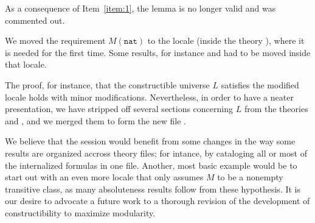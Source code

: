 As a consequence of Item~\ref{item:1}, the lemma
 is no longer valid and was commented
out.

We moved the requirement $M(\mathtt{nat})$ to the locale
 (inside the theory ), where it is needed for the first time. Some results,
for instance  and 
 had to be moved inside that
locale.

The proof, for instance, that the constructible universe $L$ satisfies
the modified locale  holds with minor
modifications. Nevertheless, in order to have a neater presentation,
we have stripped off several sections concerning $L$ from the theories
 and , and we merged them to form
the new file  . 

\medskip
{}
\medskip

We believe that the
 session  would benefit from some changes in
the way some results are organized accross theory files; for
intance, by cataloging all or most of the internalized formulas in one
file. Another, most basic example would be to start out with an even
more locale that only assumes $M$ to be a nonempty transitive class,
as many absoluteness results follow from these hypothesis.  
It is our desire to advocate a future work to a thorough
revision of the development of constructibility to maximize modularity.

